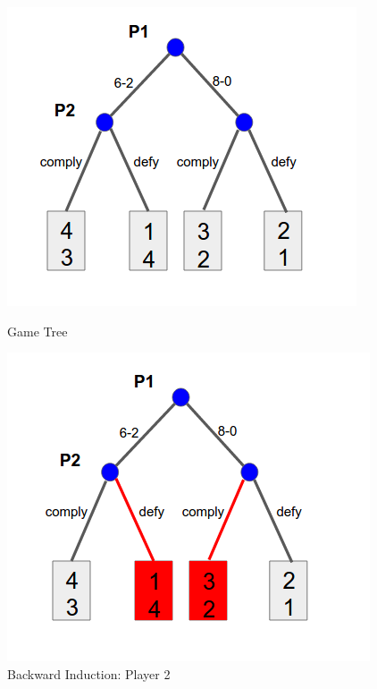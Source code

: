\documentclass{article}
\begin{document}
\begin{figure}[h!]
\centering
\begin{multicols}{3}
\label{2_gt1}
\includegraphics[width=1\columnwidth]{2_gt1.png}
\caption{Game Tree}


\includegraphics[width=1\columnwidth]{2_gt2.png}
\caption{Backward Induction: Player 2}
\label{2_gt2}



\end{multicols}
\end{figure}
\end{document}
